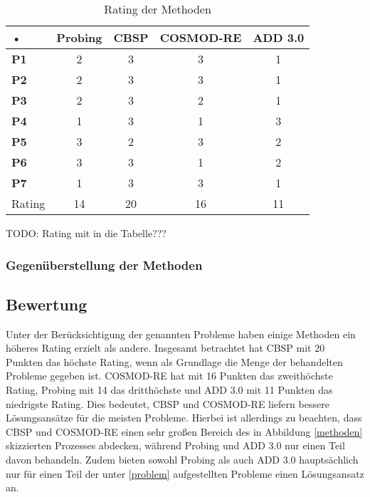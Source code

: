 \begin{table}[h] %
\caption{Rating der Methoden}
\centering
\begin{tabular}{|l|c|c|c|c|}
\hline 
\rule[-1ex]{0pt}{2.5ex} • & \textbf{Probing} & \textbf{CBSP} & \textbf{COSMOD-RE} & \textbf{ADD 3.0} \\ 
\hline 
\rule[-1ex]{0pt}{2.5ex} \textbf{P1} & 2 & 3 & 3 & 1 \\ 
\hline 
\rule[-1ex]{0pt}{2.5ex} \textbf{P2} & 2 & 3 & 3 & 1 \\ 
\hline 
\rule[-1ex]{0pt}{2.5ex} \textbf{P3} & 2 & 3 & 2 & 1 \\ 
\hline 
\rule[-1ex]{0pt}{2.5ex} \textbf{P4} & 1 & 3 & 1 & 3 \\ 
\hline 
\rule[-1ex]{0pt}{2.5ex} \textbf{P5} & 3 & 2 & 3 & 2 \\ 
\hline 
\rule[-1ex]{0pt}{2.5ex} \textbf{P6} & 3 & 3 & 1 & 2 \\ 
\hline 
\rule[-1ex]{0pt}{2.5ex} \textbf{P7} & 1 & 3 & 3 & 1 \\ 
\hline 
\hline 
\rule[-1ex]{0pt}{2.5ex} Rating & 14 & 20 & 16 & 11 \\ 
\hline 
\end{tabular} 
\label{tab:method_rating}
\end{table}

TODO: Rating mit in die Tabelle??? \\





\subsubsection{Gegenüberstellung der Methoden}





\subsection{Bewertung}
Unter der Berücksichtigung der genannten Probleme haben einige Methoden ein höheres Rating erzielt als andere. Insgesamt betrachtet hat CBSP mit 20 Punkten das höchste Rating, wenn als Grundlage die Menge der behandelten Probleme gegeben ist. COSMOD-RE hat mit 16 Punkten das zweithöchste Rating, Probing mit 14 das dritthöchste und ADD 3.0 mit 11 Punkten das niedrigste Rating. Dies bedeutet, CBSP und COSMOD-RE liefern bessere Lösungsansätze für die meisten Probleme. Hierbei ist allerdings zu beachten, dass CBSP und COSMOD-RE einen sehr großen Bereich des in Abbildung \ref{methoden} skizzierten Prozesses abdecken, während Probing und ADD 3.0 nur einen Teil davon behandeln. Zudem bieten sowohl Probing als auch ADD 3.0 hauptsächlich nur für einen Teil der unter \ref{problem} aufgestellten Probleme einen Lösungsansatz an. \\

